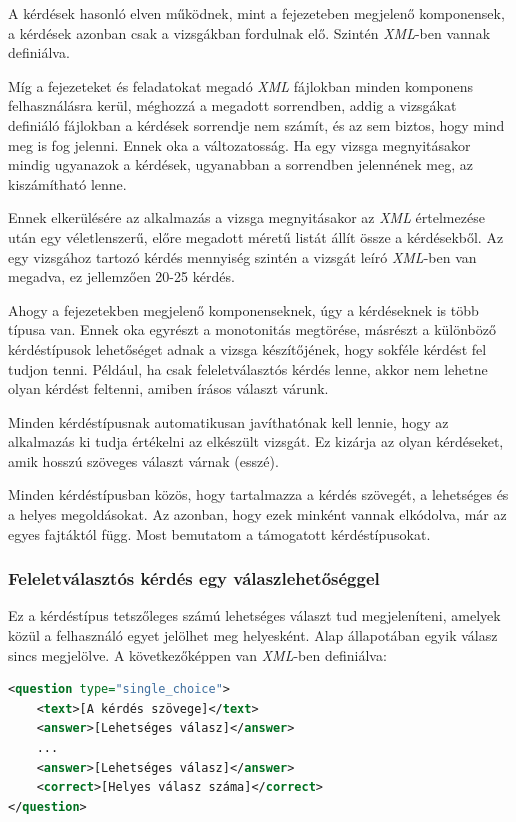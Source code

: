 \documentclass[12pt,a4paper]{article}
\newcommand{\xml}{\textit{XML}\xspace}
\begin{document}
	A kérdések hasonló elven működnek, mint a fejezeteben megjelenő komponensek, a kérdések azonban csak a vizsgákban fordulnak elő. Szintén \xml-ben vannak definiálva.
	
	Míg a fejezeteket és feladatokat megadó \xml fájlokban minden komponens felhasználásra kerül, méghozzá a megadott sorrendben, addig a vizsgákat definiáló fájlokban a kérdések sorrendje nem számít, és az sem biztos, hogy mind meg is fog jelenni. Ennek oka a változatosság. Ha egy vizsga megnyitásakor mindig ugyanazok a kérdések, ugyanabban a sorrendben jelennének meg, az kiszámítható lenne.
	
	Ennek elkerülésére az alkalmazás a vizsga megnyitásakor az \xml értelmezése után egy véletlenszerű, előre megadott méretű listát állít össze a kérdésekből. Az egy vizsgához tartozó kérdés mennyiség szintén a vizsgát leíró \xml-ben van megadva, ez jellemzően 20-25 kérdés.
	
	Ahogy a fejezetekben megjelenő komponenseknek, úgy a kérdéseknek is több típusa van. Ennek oka egyrészt a monotonitás megtörése, másrészt a különböző kérdéstípusok lehetőséget adnak a vizsga készítőjének, hogy sokféle kérdést fel tudjon tenni. Például, ha csak feleletválasztós kérdés lenne, akkor nem lehetne olyan kérdést feltenni, amiben írásos választ várunk.
	
	Minden kérdéstípusnak automatikusan javíthatónak kell lennie, hogy az alkalmazás ki tudja értékelni az elkészült vizsgát. Ez kizárja az olyan kérdéseket, amik hosszú szöveges választ várnak (esszé).
	
	Minden kérdéstípusban közös, hogy tartalmazza a kérdés szövegét, a lehetséges és a helyes megoldásokat. Az azonban, hogy ezek minként vannak elkódolva, már az egyes fajtáktól függ. Most bemutatom a támogatott kérdéstípusokat.
	
	\subsubsection{Feleletválasztós kérdés egy válaszlehetőséggel}
	
	Ez a kérdéstípus tetszőleges számú lehetséges választ tud megjeleníteni, amelyek közül a felhasználó egyet jelölhet meg helyesként. Alap állapotában egyik válasz sincs megjelölve. A következőképpen van \xml-ben definiálva:
	
	\bigskip
	\begin{lstlisting}[language=XML]
<question type="single_choice">
	<text>[A kérdés szövege]</text>
	<answer>[Lehetséges válasz]</answer>
	...
	<answer>[Lehetséges válasz]</answer>
	<correct>[Helyes válasz száma]</correct>
</question>
	\end{lstlisting}
	\bigskip
	
\end{document}
